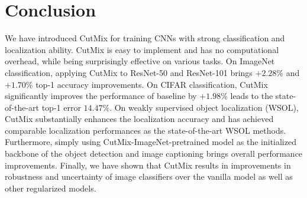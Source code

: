 \section{Conclusion}

We have introduced CutMix for training CNNs with strong classification and localization ability.
CutMix is easy to implement and has no computational overhead, while being surprisingly effective on various tasks.
On ImageNet classification, applying CutMix to ResNet-50 and ResNet-101 brings $+2.28\%$ and $+1.70\%$ top-1 accuracy improvements.
On CIFAR classification, CutMix significantly improves the performance of  baseline by $+1.98\%$ leads to the state-of-the-art top-1 error $14.47\%$.
On weakly supervised object localization (WSOL), CutMix substantially enhances the localization accuracy and has achieved comparable localization performances as the state-of-the-art WSOL methods. 
Furthermore, simply using CutMix-ImageNet-pretrained model as the initialized backbone of the object detection and image captioning brings overall performance improvements.
Finally, we have shown that CutMix results in improvements in robustness and uncertainty of image classifiers over the vanilla model as well as other regularized models.
